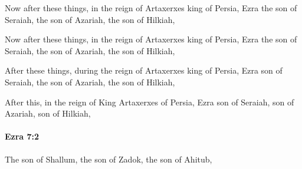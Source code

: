 			Now after these things, in the reign of Artaxerxes king of Persia, Ezra the son of Seraiah, the son of Azariah, the son of Hilkiah,

			\begin{versebox}
					\item[BHS] 
					\item[LXX] 
					\item[ASV] Now after these things, in the reign of Artaxerxes king of Persia, Ezra the son of Seraiah, the son of Azariah, the son of Hilkiah,
					\item[NIV] After these things, during the reign of Artaxerxes king of Persia, Ezra son of Seraiah, the son of Azariah, the son of Hilkiah,
					\item[NRSV] After this, in the reign of King Artaxerxes of Persia, Ezra son of Seraiah, son of Azariah, son of Hilkiah,
			\end{versebox}

		\paragraph{Ezra 7:2} %
			\label{EZRA-7-2}

			The son of Shallum, the son of Zadok, the son of Ahitub,

